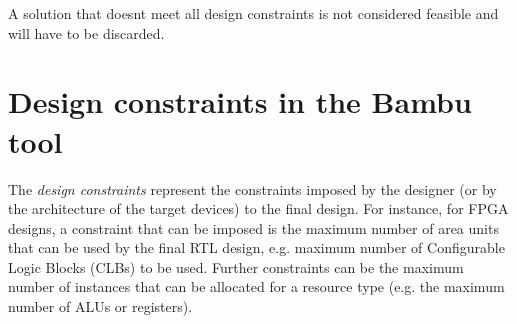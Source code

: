 A solution that doesn\textquotesingle{}t meet all design constraints is not considered feasible and will have to be discarded.\hypertarget{src_HLS_constraints_page_sec_constraints_bambu}{}\section{Design constraints in the Bambu tool}\label{src_HLS_constraints_page_sec_constraints_bambu}
The {\itshape design constraints} represent the constraints imposed by the designer (or by the architecture of the target devices) to the final design. For instance, for F\+P\+GA designs, a constraint that can be imposed is the maximum number of area units that can be used by the final R\+TL design, e.\+g. maximum number of Configurable Logic Blocks (C\+L\+Bs) to be used. Further constraints can be the maximum number of instances that can be allocated for a resource type (e.\+g. the maximum number of A\+L\+Us or registers). 